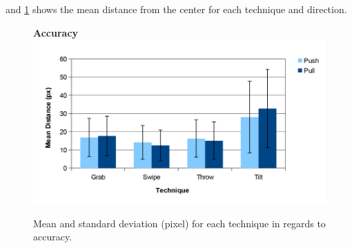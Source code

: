  and \cref{fig:accuracyGraph} shows the mean distance from the center for each technique and direction.
\begin{figure}[H]{
	\centering
	\textbf{Accuracy}\\[4pt]
	\includegraphics[width = 1\columnwidth ]{images/distance_graph.pdf}} 
	\caption{
		Mean and standard deviation (pixel) for each technique in regards to accuracy.
	}
	\label{fig:accuracyGraph}
\end{figure}